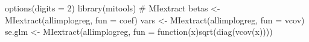 \begin{Schunk}
\begin{Sinput}
 options(digits = 2)
 library(mitools) # MIextract
 betas <- MIextract(allimplogreg, fun = coef)
 vars <- MIextract(allimplogreg, fun = vcov)
 se.glm <- MIextract(allimplogreg, fun = function(x){sqrt(diag(vcov(x)))}) 
\end{Sinput}
\end{Schunk}
